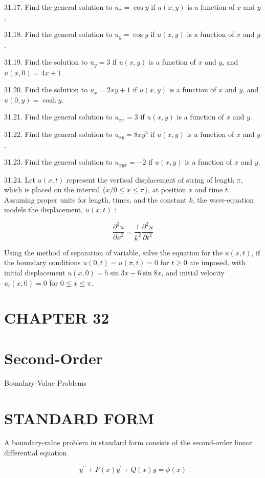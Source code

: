 \documentclass[10pt]{article}
\begin{document}
31.17. Find the general solution to $u_{x}=\cos y$ if $u(x, y)$ is a function of $x$ and $y$.

31.18. Find the general solution to $u_{y}=\cos y$ if $u(x, y)$ is a function of $x$ and $y$.

31.19. Find the solution to $u_{y}=3$ if $u(x, y)$ is a function of $x$ and $y$, and $u(x, 0)=4 x+1$.

31.20. Find the solution to $u_{x}=2 x y+1$ if $u(x, y)$ is a function of $x$ and $y$, and $u(0, y)=\cosh y$.

31.21. Find the general solution to $u_{x x}=3$ if $u(x, y)$ is a function of $x$ and $y$.

31.22. Find the general solution to $u_{x y}=8 x y^{3}$ if $u(x, y)$ is a function of $x$ and $y$.

31.23. Find the general solution to $u_{x y x}=-2$ if $u(x, y)$ is a function of $x$ and $y$.

31.24. Let $u(x, t)$ represent the vertical displacement of string of length $\pi$, which is placed on the interval $\{x / 0 \leq x \leq \pi\}$, at position $x$ and time $t$. Assuming proper units for length, times, and the constant $k$, the wave-equation models the displacement, $u(x, t)$ :

$$
\frac{\partial^{2} u}{\partial x^{2}}=\frac{1}{k^{2}} \frac{\partial^{2} u}{\partial t^{2}}
$$

Using the method of separation of variable, solve the equation for the $u(x, t)$, if the boundary conditions $u(0, t)=u(\pi, t)=0$ for $t \geq 0$ are imposed, with initial displacement $u(x, 0)=5 \sin 3 x-6 \sin 8 x$, and initial velocity $u_{t}(x, 0)=0$ for $0 \leq x \leq \pi$.

\section*{CHAPTER 32}
\section*{Second-Order}
 Boundary-Value Problems\section*{STANDARD FORM}
A boundary-value problem in standard form consists of the second-order linear differential equation


\begin{equation*}
y^{\prime \prime}+P(x) y^{\prime}+Q(x) y=\phi(x) \tag{32.1}
\end{equation*}
\end{document}
